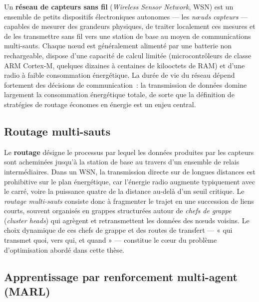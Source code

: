 Un \textbf{réseau de capteurs sans fil} (\emph{Wireless Sensor Network}, WSN) est un ensemble de petits dispositifs électroniques autonomes — les \emph{nœuds capteurs} — capables de mesurer des grandeurs physiques, de traiter localement ces mesures et de les transmettre sans fil vers une station de base au moyen de communications multi-sauts\cite{chong2003sensor,yarali_wireless_2020}. Chaque nœud est généralement alimenté par une batterie non rechargeable, dispose d'une capacité de calcul limitée (microcontrôleurs de classe ARM Cortex-M, quelques dizaines à centaines de kilooctets de RAM) et d'une radio à faible consommation énergétique\cite{yarali_wireless_2020,dietrich2009lifetime}. La durée de vie du réseau dépend fortement des décisions de communication~: la transmission de données domine largement la consommation énergétique totale, de sorte que la définition de stratégies de routage économes en énergie est un enjeu central\cite{heinzelman2000leach,dietrich2009lifetime}.

\subsection*{Routage multi-sauts}

Le \textbf{routage} désigne le processus par lequel les données produites par les capteurs sont acheminées jusqu'à la station de base au travers d'un ensemble de relais intermédiaires. Dans un WSN, la transmission directe sur de longues distances est prohibitive sur le plan énergétique, car l'énergie radio augmente typiquement avec le carré, voire la puissance quatre de la distance au-delà d'un seuil critique\cite{heinzelman2000leach,heinzelman2002leach}. Le \emph{routage multi-sauts} consiste donc à fragmenter le trajet en une succession de liens courts, souvent organisés en grappes structurées autour de \emph{chefs de grappe} (\emph{cluster heads}) qui agrègent et retransmettent les données des nœuds voisins\cite{younis2004heed,chong2003sensor}. Le choix dynamique de ces chefs de grappe et des routes de transfert — « qui transmet quoi, vers qui, et quand » — constitue le cœur du problème d'optimisation abordé dans cette thèse\cite{metaheuristic_wsn_slr2026,chaurasia_mocraw_2023}.

\subsection*{Apprentissage par renforcement multi-agent (MARL)}

